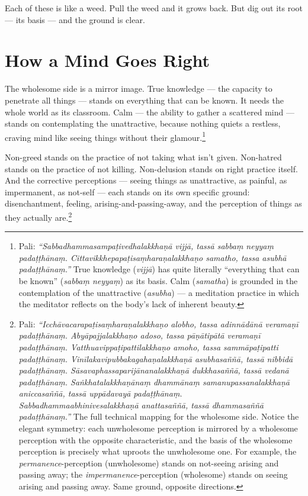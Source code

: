 Each of these is like a weed. Pull the weed and it grows back. But dig out its root --- its basis --- and the ground is clear.

\section*{How a Mind Goes Right}

The wholesome side is a mirror image. True knowledge --- the capacity to penetrate all things --- stands on everything that can be known. It needs the whole world as its classroom. Calm --- the ability to gather a scattered mind --- stands on contemplating the unattractive, because nothing quiets a restless, craving mind like seeing things without their glamour.\footnote{Pali: \textit{``Sabbadhammasampaṭivedhalakkhaṇā vijjā, tassā sabbaṃ neyyaṃ padaṭṭhānaṃ. Cittavikkhepapaṭisaṃharaṇalakkhaṇo samatho, tassa asubhā padaṭṭhānaṃ.''} True knowledge (\textit{vijjā}) has quite literally ``everything that can be known'' (\textit{sabbaṃ neyyaṃ}) as its basis. Calm (\textit{samatha}) is grounded in the contemplation of the unattractive (\textit{asubha}) --- a meditation practice in which the meditator reflects on the body's lack of inherent beauty.}

Non-greed stands on the practice of not taking what isn't given. Non-hatred stands on the practice of not killing. Non-delusion stands on right practice itself. And the corrective perceptions --- seeing things as unattractive, as painful, as impermanent, as not-self --- each stands on its own specific ground: disenchantment, feeling, arising-and-passing-away, and the perception of things as they actually are.\footnote{Pali: \textit{``Icchāvacarapaṭisaṃharaṇalakkhaṇo alobho, tassa adinnādānā veramaṇī padaṭṭhānaṃ. Abyāpajjalakkhaṇo adoso, tassa pāṇātipātā veramaṇī padaṭṭhānaṃ. Vatthuavippaṭipattilakkhaṇo amoho, tassa sammāpaṭipatti padaṭṭhānaṃ. Vinīlakavipubbakagahaṇalakkhaṇā asubhasaññā, tassā nibbidā padaṭṭhānaṃ. Sāsavaphassaparijānanalakkhaṇā dukkhasaññā, tassā vedanā padaṭṭhānaṃ. Saṅkhatalakkhaṇānaṃ dhammānaṃ samanupassanalakkhaṇā aniccasaññā, tassā uppādavayā padaṭṭhānaṃ. Sabbadhammaabhinivesalakkhaṇā anattasaññā, tassā dhammasaññā padaṭṭhānaṃ.''} The full technical mapping for the wholesome side. Notice the elegant symmetry: each unwholesome perception is mirrored by a wholesome perception with the opposite characteristic, and the basis of the wholesome perception is precisely what uproots the unwholesome one. For example, the \textit{permanence}-perception (unwholesome) stands on not-seeing arising and passing away; the \textit{impermanence}-perception (wholesome) stands on seeing arising and passing away. Same ground, opposite directions.}


